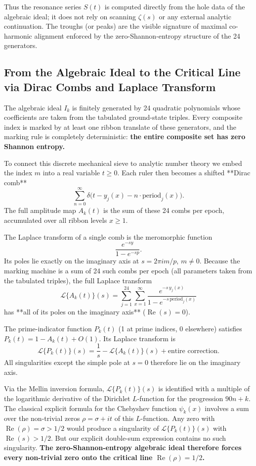\documentclass[11pt,a4paper]{article}
\begin{document}
Thus the resonance series \(S(t)\) is computed directly from the hole data of the algebraic ideal; it does not rely on scanning \(\zeta(s)\) or any external analytic continuation. The troughs (or peaks) are the visible signature of maximal co-harmonic alignment enforced by the zero-Shannon-entropy structure of the 24 generators.


\subsection{From the Algebraic Ideal to the Critical Line via Dirac Combs and Laplace Transform}

The algebraic ideal \(I_k\) is finitely generated by 24 quadratic polynomials whose coefficients are taken from the tabulated ground-state triples. Every composite index is marked by at least one ribbon translate of these generators, and the marking rule is completely deterministic: \textbf{the entire composite set has zero Shannon entropy.}

To connect this discrete mechanical sieve to analytic number theory we embed the index \(m\) into a real variable \(t \ge 0\). Each ruler then becomes a shifted **Dirac comb**
\[
\sum_{n=0}^\infty \delta\bigl(t - y_j(x) - n \cdot \text{period}_j(x)\bigr).
\]
The full amplitude map \(A_k(t)\) is the sum of these 24 combs per epoch, accumulated over all ribbon levels \(x \ge 1\).

The Laplace transform of a single comb is the meromorphic function
\[
\frac{e^{-s y}}{1 - e^{-s p}}.
\]
Its poles lie exactly on the imaginary axis at \(s = 2\pi i m / p\), \(m \neq 0\). Because the marking machine is a sum of 24 such combs per epoch (all parameters taken from the tabulated triples), the full Laplace transform
\[
\mathcal{L}\{A_k(t)\}(s) = \sum_{j=1}^{24} \sum_{x=1}^\infty \frac{e^{-s\, y_j(x)}}{1 - e^{-s\, \text{period}_j(x)}}
\]
has **all of its poles on the imaginary axis** (\(\operatorname{Re}(s) = 0\)).

The prime-indicator function \(P_k(t)\) (1 at prime indices, 0 elsewhere) satisfies \(P_k(t) = 1 - A_k(t) + O(1)\). Its Laplace transform is
\[
\mathcal{L}\{P_k(t)\}(s) = \frac{1}{s} - \mathcal{L}\{A_k(t)\}(s) + \text{entire correction}.
\]
All singularities except the simple pole at \(s=0\) therefore lie on the imaginary axis.

Via the Mellin inversion formula, \(\mathcal{L}\{P_k(t)\}(s)\) is identified with a multiple of the logarithmic derivative of the Dirichlet \(L\)-function for the progression \(90n+k\). The classical explicit formula for the Chebyshev function \(\psi_k(x)\) involves a sum over the non-trivial zeros \(\rho = \sigma + it\) of this \(L\)-function. Any zero with \(\operatorname{Re}(\rho) = \sigma > 1/2\) would produce a singularity of \(\mathcal{L}\{P_k(t)\}(s)\) with \(\operatorname{Re}(s) > 1/2\). But our explicit double-sum expression contains no such singularity. \textbf{The zero-Shannon-entropy algebraic ideal therefore forces every non-trivial zero onto the critical line \(\operatorname{Re}(\rho) = 1/2\).}
\end{document}
